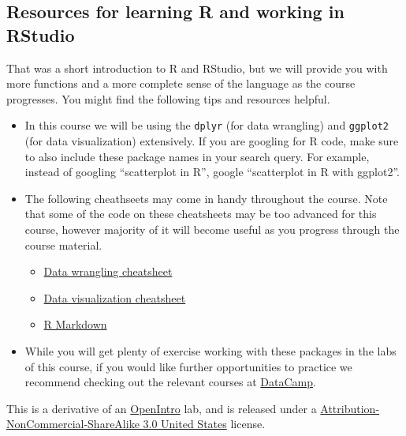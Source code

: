 \documentclass[
]{article}
\providecommand{\tightlist}{%
  \setlength{\itemsep}{0pt}\setlength{\parskip}{0pt}}
\begin{document}
\subsection{Resources for learning R and working in
RStudio}\label{resources-for-learning-r-and-working-in-rstudio}

That was a short introduction to R and RStudio, but we will provide you
with more functions and a more complete sense of the language as the
course progresses. You might find the following tips and resources
helpful.

\begin{itemize}
\item
  In this course we will be using the \texttt{dplyr} (for data
  wrangling) and \texttt{ggplot2} (for data visualization) extensively.
  If you are googling for R code, make sure to also include these
  package names in your search query. For example, instead of googling
  ``scatterplot in R'', google ``scatterplot in R with ggplot2''.
\item
  The following cheathseets may come in handy throughout the course.
  Note that some of the code on these cheatsheets may be too advanced
  for this course, however majority of it will become useful as you
  progress through the course material.

  \begin{itemize}
  \tightlist
  \item
    \href{http://www.rstudio.com/wp-content/uploads/2015/02/data-wrangling-cheatsheet.pdf}{Data
    wrangling cheatsheet}
  \item
    \href{http://www.rstudio.com/wp-content/uploads/2015/12/ggplot2-cheatsheet-2.0.pdf}{Data
    visualization cheatsheet}
  \item
    \href{http://www.rstudio.com/wp-content/uploads/2016/03/rmarkdown-cheatsheet-2.0.pdf}{R
    Markdown}
  \end{itemize}
\item
  While you will get plenty of exercise working with these packages in
  the labs of this course, if you would like further opportunities to
  practice we recommend checking out the relevant courses at
  \href{https://www.datacamp.com/courses}{DataCamp}.
\end{itemize}

\label{license}
This is a derivative of an
\href{https://www.openintro.org/stat/labs.php}{OpenIntro} lab, and is
released under a
\href{https://creativecommons.org/licenses/by-nc-sa/3.0/us/}{Attribution-NonCommercial-ShareAlike
3.0 United States} license.
\end{document}

